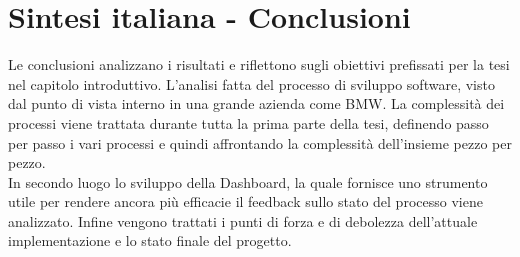 \documentclass[../main.tex]{subfiles}
\begin{document}
\section{Sintesi italiana - Conclusioni}
Le conclusioni analizzano i risultati e riflettono sugli obiettivi prefissati per la tesi nel capitolo introduttivo. 
L'analisi fatta del processo di sviluppo software, visto dal punto di vista interno in una grande azienda come \gls{BMW}. La complessità dei processi viene trattata durante tutta la prima parte della tesi, definendo passo per passo i vari processi e quindi affrontando la complessità dell'insieme pezzo per pezzo.\\
In secondo luogo lo sviluppo della Dashboard, la quale fornisce uno strumento utile per rendere ancora più efficacie il feedback sullo stato del processo viene analizzato. Infine vengono trattati i punti di forza e di debolezza dell'attuale implementazione e lo stato finale del progetto.
\cleardoublepage
\end{document}
